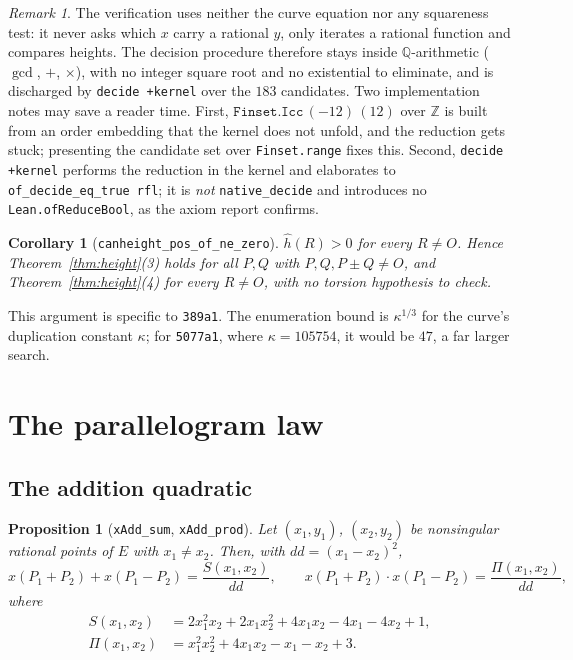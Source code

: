 \documentclass[11pt,reqno]{amsart}
\theoremstyle{plain}
\newtheorem{proposition}[theorem]{Proposition}
\newtheorem{corollary}[theorem]{Corollary}
\theoremstyle{definition}
\theoremstyle{remark}
\newtheorem{remark}[theorem]{Remark}
\DeclareRobustCommand{\lt}[1]{\texttt{#1}}
\newcommand{\hh}{\widehat{h}}
\begin{document}
\begin{remark}
The verification uses neither the curve equation nor any squareness test: it
never asks which $x$ carry a rational $y$, only iterates a rational function
and compares heights. The decision procedure therefore stays inside
$\mathbb{Q}$-arithmetic ($\gcd$, $+$, $\times$), with no integer square root
and no existential to eliminate, and is discharged by \lt{decide +kernel}
over the $183$ candidates. Two implementation notes may save a reader time.
First, $\lt{Finset.Icc}\,(-12)\,(12)$ over $\mathbb{Z}$ is built from an
order embedding that the kernel does not unfold, and the reduction gets
stuck; presenting the candidate set over \lt{Finset.range} fixes this.
Second, \lt{decide +kernel} performs the reduction in the kernel and
elaborates to \lt{of\_decide\_eq\_true rfl}; it is \emph{not}
\lt{native\_decide} and introduces no \lt{Lean.ofReduceBool}, as the axiom
report confirms.
\end{remark}

\begin{corollary}[\lt{canheight\_pos\_of\_ne\_zero}]\label{cor:hpos}
$\hh(R) > 0$ for every $R \ne O$. Hence Theorem~\ref{thm:height}(3) holds
for all $P, Q$ with $P, Q, P{\pm}Q \ne O$, and Theorem~\ref{thm:height}(4)
for every $R \ne O$, with no torsion hypothesis to check.
\end{corollary}

This argument is specific to \texttt{389a1}. The enumeration bound is
$\kappa^{1/3}$ for the curve's duplication constant $\kappa$; for
\texttt{5077a1}, where $\kappa = 105754$, it would be $47$, a far larger
search.

\section{The parallelogram law}

\subsection{The addition quadratic}

\begin{proposition}[\lt{xAdd\_sum}, \lt{xAdd\_prod}]\label{prop:addquad}
Let $(x_1,y_1)$, $(x_2,y_2)$ be nonsingular rational points of $E$ with
$x_1 \ne x_2$. Then, with $dd = (x_1-x_2)^2$,
\[
  x(P_1+P_2) + x(P_1-P_2) = \frac{S(x_1,x_2)}{dd}, \qquad
  x(P_1+P_2)\cdot x(P_1-P_2) = \frac{\Pi(x_1,x_2)}{dd},
\]
where
\begin{align*}
  S(x_1,x_2) &= 2x_1^2x_2 + 2x_1x_2^2 + 4x_1x_2 - 4x_1 - 4x_2 + 1,\\
  \Pi(x_1,x_2) &= x_1^2x_2^2 + 4x_1x_2 - x_1 - x_2 + 3 .
\end{align*}
\end{proposition}
\end{document}
